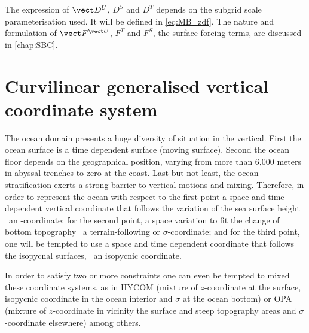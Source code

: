 \documentclass[../main/NEMO_manual]{subfiles}
\begin{document}
The expression of $\vect D^{U}$, $D^{S}$ and $D^{T}$ depends on
the subgrid scale parameterisation used.
It will be defined in \autoref{eq:MB_zdf}.
The nature and formulation of $\vect F^{\vect U}$, $F^T$ and $F^S$, the surface forcing terms,
are discussed in \autoref{chap:SBC}.

\section{Curvilinear generalised vertical coordinate system}
\label{sec:MB_gco}

The ocean domain presents a huge diversity of situation in the vertical.
First the ocean surface is a time dependent surface (moving surface).
Second the ocean floor depends on the geographical position,
varying from more than 6,000 meters in abyssal trenches to zero at the coast.
Last but not least, the ocean stratification exerts a strong barrier to vertical motions and mixing.
Therefore, in order to represent the ocean with respect to the first point
a space and time dependent vertical coordinate that follows the variation of the sea surface height
\eg\ an \zstar-coordinate;
for the second point,
a space variation to fit the change of bottom topography
\eg\ a terrain-following or $\sigma$-coordinate;
and for the third point,
one will be tempted to use a space and time dependent coordinate that follows the isopycnal surfaces,
\eg\ an isopycnic coordinate.

In order to satisfy two or more constraints one can even be tempted to mixed these coordinate systems,
as in HYCOM (mixture of $z$-coordinate at the surface, isopycnic coordinate in the ocean interior and
$\sigma$ at the ocean bottom) \citep{chassignet.smith.ea_JPO03} or
OPA (mixture of $z$-coordinate in vicinity the surface and steep topography areas and
$\sigma$-coordinate elsewhere) \citep{madec.delecluse.ea_JPO96} among others.
\end{document}
